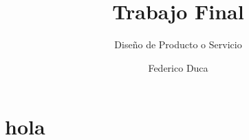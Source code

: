 \documentclass[10pt]{article}
\title{Trabajo Final}
\subtitle{Diseño de Producto o Servicio}
\author{Federico Duca}
\begin{document}
\maketitle

\section{}

\newpage

\section{hola}
\end{document}

